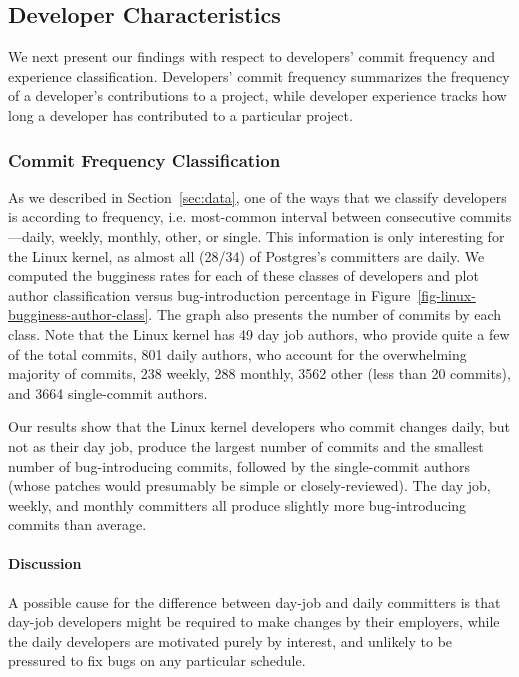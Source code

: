 
\subsection{Developer Characteristics}
\label{sec-dev-char}
We next present our findings with respect to developers' commit
frequency and experience classification. Developers'
commit frequency summarizes the frequency of
a developer's contributions to a project, while developer experience
tracks how long a developer has contributed to a particular project.

\subsubsection{Commit Frequency Classification} 
As we described in Section~\ref{sec:data}, one of the ways that we
classify developers is according to frequency, i.e. most-common
interval between consecutive commits---daily, weekly, monthly, other,
or single.  This information is only interesting for the Linux kernel,
as almost all (28/34) of Postgres's committers are daily. We computed
the bugginess rates for each of these classes of developers and plot
author classification versus bug-introduction percentage in
Figure~\ref{fig-linux-bugginess-author-class}. The graph also presents
the number of commits by each class. Note that the Linux kernel has 49
day job authors, who provide quite a few of the total commits, 801 daily authors, who account for the overwhelming majority of commits, 238
weekly, 288 monthly, 3562 other (less than 20 commits), 
and 3664 single-commit authors.

Our results show that the Linux kernel developers who commit changes daily, but
not as their day job, produce the largest number of commits and the
smallest number of bug-introducing
commits, followed by the single-commit authors (whose patches would
presumably be simple or closely-reviewed). The day job, weekly, and
monthly committers all produce slightly more bug-introducing commits
than average.

\paragraph{Discussion}
A possible cause for the difference between day-job and daily
committers is that day-job developers might be required to make
changes by their employers, while the daily developers are motivated
purely by interest, and unlikely to be pressured to fix bugs on any
particular schedule.

